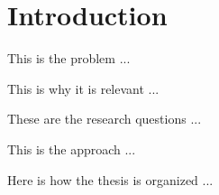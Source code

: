 \chapter{Introduction}
\label{cha:intro}
\vspace{0.4 cm}

This is the problem ...

This is why it is relevant ...

These are the research questions ...

This is the approach ...

Here is how the thesis is organized ...
